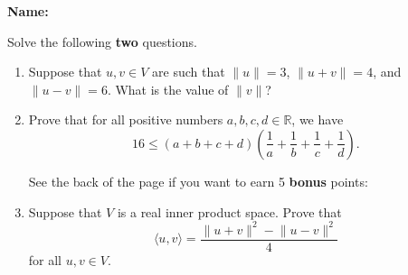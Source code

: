 \documentclass[12pt]{article}
\newcommand{\points}[1]{\marginpar{\hspace{24pt}[#1]}}
\newcommand{\R}{\mathbb{R}}
\newcommand{\len}[1]{\lVert #1\rVert}
\begin{document}
\thispagestyle{fancy}
{\bf Name:}

\bigskip

Solve the following {\bf two} questions. 
 \begin{enumerate}
 \item Suppose that $u,v\in V$ are such that $\len{u}=3$, $\len{u+v}=4$, and $\len{u-v}=6$. What is the value of $\len{v}$? \points{5}

\vspace{3.4in}

 \item Prove that for all positive numbers $a,b,c,d\in\R$, we have \points{5}
\[
 16\leq (a+b+c+d)\left(\frac{1}{a}+\frac{1}{b}+\frac{1}{c}+\frac{1}{d}\right).
\]
\vspace{3.2in}

See the back of the page if you want to earn 5 {\bf bonus} points:
\newpage

\item Suppose that $V$ is a real inner product space. Prove that \points{5}
\[
 \langle u,v\rangle = \frac{\len{u+v}^2-\len{u-v}^2}{4}
\]
for all $u,v\in V$.
 \end{enumerate}
\end{document}
